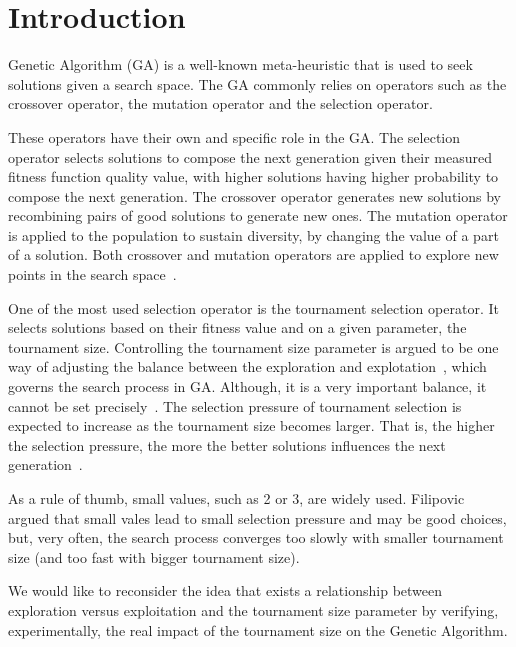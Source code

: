 \section{Introduction}\label{intro}

 Genetic Algorithm (GA) is a well-known meta-heuristic that is used to seek solutions given a search space. The GA commonly relies on operators such as the crossover operator, the mutation operator and the selection operator.
 
  These operators have their own and specific role in the GA. The selection operator selects solutions to compose the next generation given their measured fitness function quality value, with higher solutions having higher probability to compose the next generation. The crossover operator generates new solutions by recombining pairs of good solutions to generate new ones. The mutation operator is applied to the population to sustain diversity, by changing the value of a part of a solution. Both crossover and mutation operators are applied to explore new points in the search space~\cite{blickle1995mathematical}.

One of the most used selection operator is the tournament selection operator. It selects solutions based on their fitness value and on a given parameter, the tournament size. Controlling the tournament size parameter is argued to be one way of adjusting the balance between the exploration and explotation~\cite{blickle1995mathematical}, which governs the search process in GA. Although, it is a very important balance, it cannot be set precisely~\cite{filipovic2012fine}. The selection pressure of tournament selection is expected to increase as the tournament size becomes larger. That is, the higher the selection pressure, the more the better solutions influences the next generation~\cite{miller1995genetic}. 

As a rule of thumb, small values, such as 2 or 3, are widely used. Filipovic~\cite{filipovic2012fine} argued that small vales lead to small selection pressure and may be good choices, but, very often, the search process converges too slowly with smaller tournament size (and too fast with bigger tournament size). 

 
 We would like to reconsider the idea that exists a relationship between exploration versus exploitation and the tournament size parameter by verifying, experimentally, the real impact of the tournament size on the Genetic Algorithm.
 
